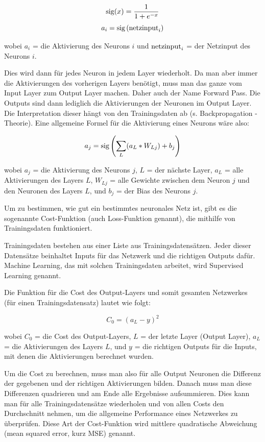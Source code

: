 \documentclass{scrartcl}
\begin{document}
	{\Large
	\[
		\textrm{sig}(x)=\frac{1}{1+e^{-x}}
		\]
	\[
		a_i=\textrm{sig}\left({\textrm{netzinput}}_i \right)
		\]}
	
	wobei $a_i$ = die Aktivierung des Neurons $i$ und $\textrm{netzinput}_{i}$ = der Netzinput des Neurons $i$.

	Dies wird dann für jedes Neuron in jedem Layer wiederholt. Da man aber immer die Aktivierungen des vorherigen Layers benötigt, muss man das ganze vom Input Layer zum Output Layer machen. Daher auch der Name Forward Pass. Die Outputs sind dann lediglich die Aktivierungen der Neuronen im Output Layer. Die Interpretation dieser hängt von den Trainingsdaten ab (s. Backpropagation - Theorie). Eine allgemeine Formel für die Aktivierung eines Neurons wäre also: 

	{\Large \[
		a_{j} = \textrm{sig}\left(\sum_{L} (a_{L} * W_{Lj}) + b_{j}\right)
		\]}
		
	\noindent wobei $a_j$ = die Aktivierung des Neurons $j$, $L$ = der nächste Layer, $a_L$ = alle Aktivierungen des Layers $L$, $W_{Lj}$ = alle Gewichte zwischen dem Neuron $j$ und den Neuronen des Layers $L$, und $b_j$ = der Bias des Neurons $j$. \cite{brotcrunsher:forwardpass}
	

	Um zu bestimmen, wie gut ein bestimmtes neuronales Netz ist, gibt es die sogenannte Cost-Funktion (auch Loss-Funktion genannt), die mithilfe von Trainingsdaten funktioniert.
	
	Trainingsdaten bestehen aus einer Liste aus Trainingsdatensätzen. Jeder dieser Datensätze beinhaltet Inputs für das Netzwerk und die richtigen Outputs dafür. Machine Learning, das mit solchen Trainingsdaten arbeitet, wird Supervised Learning genannt.

	Die Funktion für die Cost des Output-Layers und somit gesamten Netzwerkes (für einen Trainingsdatensatz) lautet wie folgt:

	{\Large \[
		C_0 = (a_L - y)^2
	\]}


	\noindent wobei $C_0$ = die Cost des Output-Layers, $L$ = der letzte Layer (Output Layer), $a_L$ = die Aktivierungen des Layers $L$, und $y$ = die richtigen Outputs für die Inputs, mit denen die Aktivierungen berechnet wurden. 
	
	Um die Cost zu berechnen, muss man also für alle Output Neuronen die Differenz der gegebenen und der richtigen Aktivierungen bilden. Danach muss man diese Differenzen quadrieren und am Ende alle Ergebnisse aufsummieren. Dies kann man für alle Trainingsdatensätze wiederholen und von allen Costs den Durchschnitt nehmen, um die allgemeine Performance eines Netzwerkes zu überprüfen. Diese Art der Cost-Funktion wird mittlere quadratische Abweichung (mean squared error, kurz MSE) genannt. 
	
\end{document}
